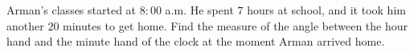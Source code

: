 Arman's classes started at $8{:}00$ a.m. He spent $7$ hours at school, and it took him another $20$ minutes to get home. Find the measure of the angle between the hour hand and the minute hand of the clock at the moment Arman arrived home.
